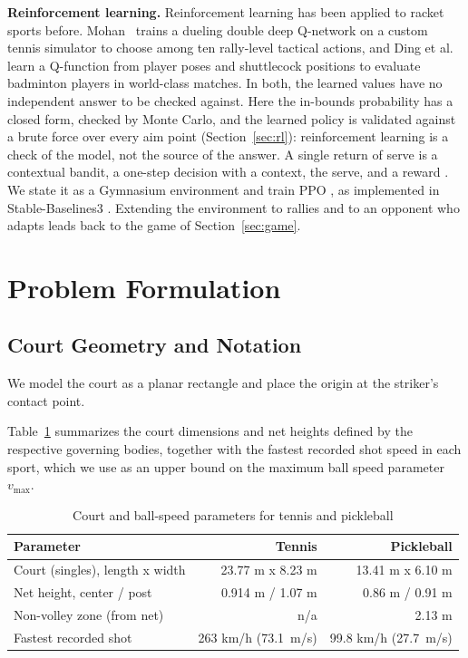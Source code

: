   \textbf{Reinforcement learning.} Reinforcement learning has been applied to
  racket sports before. Mohan~\cite{mohan2025tennis} trains a dueling double
  deep Q-network on a custom tennis simulator to choose among ten rally-level
  tactical actions, and Ding et al.~\cite{ding2022racket} learn a Q-function
  from player poses and shuttlecock positions to evaluate badminton players in
  world-class matches. In both, the learned values have no independent answer
  to be checked against. Here the in-bounds probability has a closed form,
  checked by Monte Carlo, and the learned policy is validated against a brute
  force over every aim point (Section~\ref{sec:rl}): reinforcement learning is
  a check of the model, not the source of the answer. A single return of serve
  is a contextual bandit, a one-step decision with a context, the serve, and a
  reward \cite{lattimore2020bandit}. We state it as a Gymnasium environment
  \cite{towers2024gymnasium} and train PPO \cite{schulman2017ppo}, as
  implemented in Stable-Baselines3 \cite{raffin2021sb3}. Extending the
  environment to rallies and to an opponent who adapts leads back to the game
  of Section~\ref{sec:game}.

  \section{Problem Formulation}\label{sec:problem}

  \subsection{Court Geometry and Notation}\label{sec:court}

  We model the court as a planar rectangle and place the origin at the
  striker's contact point.

  Table~\ref{tab:court} summarizes the court dimensions and net heights defined
  by the respective governing bodies, together with the fastest recorded shot
  speed in each sport, which we use as an upper bound on the maximum ball speed
  parameter $v_{\max}$.

  \begin{table}[htbp]
    \centering
    \caption{Court and ball-speed parameters for tennis and pickleball}
    \label{tab:court}
    \begin{tabular}{lrr}
      \toprule
      Parameter & Tennis & Pickleball \\
      \midrule
      Court (singles), length x width & 23.77 m x 8.23 m & 13.41 m x 6.10 m \\
      Net height, center / post & 0.914 m / 1.07 m & 0.86 m / 0.91 m \\
      Non-volley zone (from net) & n/a & 2.13 m \\
      Fastest recorded shot & 263 km/h (73.1~m/s) & 99.8 km/h (27.7~m/s) \\
      \bottomrule
    \end{tabular}
  \end{table}


